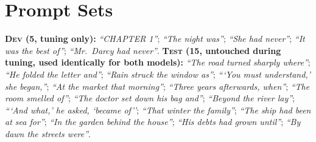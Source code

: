 \section{Prompt Sets}
\label{app:prompts}
\textbf{\textsc{Dev} (5, tuning only):} \emph{``CHAPTER 1''}; \emph{``The night was''}; \emph{``She had never''}; \emph{``It was the best of''}; \emph{``Mr.\ Darcy had never''}.
\textbf{\textsc{Test} (15, untouched during tuning, used identically for both models):} \emph{``The road turned sharply where''}; \emph{``He folded the letter and''}; \emph{``Rain struck the window as''}; \emph{```You must understand,' she began,''}; \emph{``At the market that morning''}; \emph{``Three years afterwards, when''}; \emph{``The room smelled of''}; \emph{``The doctor set down his bag and''}; \emph{``Beyond the river lay''}; \emph{```And what,' he asked, `became of''}; \emph{``That winter the family''}; \emph{``The ship had been at sea for''}; \emph{``In the garden behind the house''}; \emph{``His debts had grown until''}; \emph{``By dawn the streets were''}.
